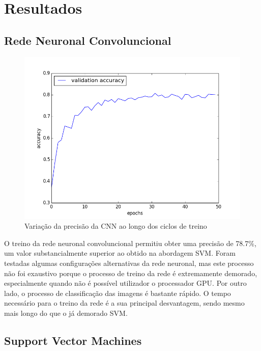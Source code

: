 \documentclass[extendedabs]{vcom}
\begin{document}
\section{Resultados}

\subsection{Rede Neuronal Convoluncional}

\begin{figure}[h]
\includegraphics[width=\linewidth]{images/obj_rec_graph_50.png}
\caption{Variação da precisão da CNN ao longo dos ciclos de treino}
\label{fig:graph2}
\end{figure}

O treino da rede neuronal convoluncional permitiu obter uma precisão de 78.7\%, um valor substancialmente superior ao obtido na abordagem SVM. Foram testadas algumas configurações alternativas da rede neuronal, mas este processo não foi exaustivo porque o processo de treino da rede é extremamente demorado, especialmente quando não é possível utilizador o processador GPU. Por outro lado, o processo de classificação das imagens é bastante rápido. O tempo necessário para o treino da rede é a sua principal desvantagem, sendo mesmo mais longo do que o já demorado SVM.

\subsection{Support Vector Machines}
\end{document}
